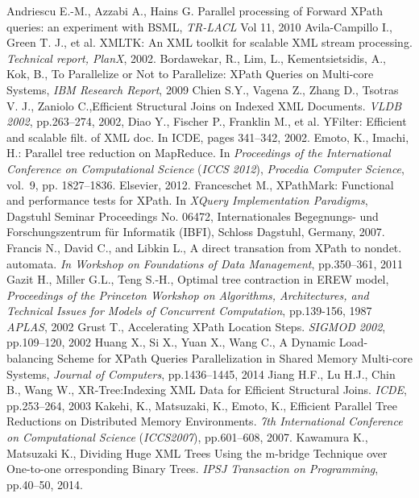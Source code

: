 \begin{thebibliography}{99}
Andriescu E.-M., Azzabi A., Hains G. Parallel 
processing of Forward XPath queries: an experiment 
with BSML, \emph{TR-LACL} Vol 11, 2010 
Avila-Campillo I., Green T. J., et al. XMLTK: An
XML toolkit for scalable XML stream processing.
\emph{Technical report, PlanX}, 2002.
Bordawekar, R., Lim, L., Kementsietsidis, A., Kok, 
B., To Parallelize or Not to Parallelize: XPath 
Queries on Multi-core Systems, \emph{IBM Research 
Report}, 2009 
Chien S.Y., Vagena Z., Zhang D., Tsotras V. J., Zaniolo C.,Efficient 
Structural Joins on Indexed XML Documents. \emph{VLDB 2002}, pp.263--274, 2002,
Diao Y., Fischer P., Franklin M., et al. YFilter:
Efficient and scalable filt. of XML doc. In ICDE,
pages 341--342, 2002.
Emoto, K., Imachi, H.: Parallel tree reduction on {MapReduce}.
In \emph{Proceedings of the International Conference
  on Computational Science} (\emph{ICCS 2012}),
  \emph{Procedia Computer Science}, vol.~9, pp. 1827--1836. Elsevier, 2012.
Franceschet M., XPathMark: Functional and performance tests for XPath.
In \emph{XQuery Implementation Paradigms}, Dagstuhl Seminar Proceedings No. 06472, Internationales Begegnungs- und Forschungszentrum f{\"u}r Informatik (IBFI), Schloss Dagstuhl, Germany, 2007.
Francis N., David C., and Libkin L., A direct
transation from XPath to nondet. automata. \emph{In
Workshop on Foundations of Data Management}, pp.350--361, 2011
Gazit H., Miller G.L., Teng S.-H., Optimal tree contraction in EREW model, \emph{Proceedings of the Princeton Workshop on Algorithms, Architectures, and Technical Issues for Models of Concurrent Computation}, pp.139-156, 1987
\emph{APLAS}, 2002
Grust T., Accelerating XPath Location Steps. \emph{SIGMOD 2002}, pp.109--120, 2002
Huang X., Si X., Yuan X., Wang C., A Dynamic 
Load-balancing Scheme for XPath Queries Parallelization 
in Shared Memory Multi-core Systems, 
\emph{Journal of Computers}, pp.1436--1445, 2014 
Jiang H.F., Lu H.J., Chin B., Wang W., XR-Tree:Indexing XML Data for 
Efficient Structural Joins. \emph{ICDE}, pp.253--264, 2003
Kakehi, K., Matsuzaki, K., Emoto, K.,
Efficient Parallel Tree Reductions on Distributed Memory Environments.
\emph{7th International Conference on Computational Science} (\emph{ICCS2007}), pp.601--608, 2007.
Kawamura K., Matsuzaki K., Dividing Huge XML Trees Using the m-bridge Technique over One-to-one orresponding Binary Trees. \emph{IPSJ Transaction on Programming}, pp.40--50, 2014. 

\end{thebibliography}
